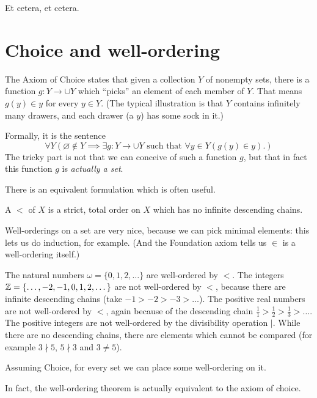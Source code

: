 Et cetera, et cetera.

\section{Choice and well-ordering}
The Axiom of Choice states that given a collection $Y$ of nonempty sets,
there is a function $g : Y \to \cup Y$ which ``picks'' an element of each member of $Y$.
That means $g(y) \in y$ for every $y \in Y$.
(The typical illustration is that $Y$ contains infinitely many drawers,
and each drawer (a $y$) has some sock in it.)

Formally, it is the sentence
\[ \forall Y \left(\varnothing \notin Y
	\implies 
	\exists g : Y \to \cup Y
	\text{ such that }
	\forall y \in Y \left( g(y) \in y \right).
	\right)
\]
The tricky part is not that we can conceive of such a function $g$,
but that in fact this function $g$ is \emph{actually a set}.

There is an equivalent formulation which is often useful.
\begin{definition}
	A  $<$ of $X$ is a strict, total order on $X$
	which has no infinite descending chains.
\end{definition}
Well-orderings on a set are very nice, because we can pick minimal elements:
this lets us do induction, for example.
(And the Foundation axiom tells us $\in$ is a well-ordering itself.)

\begin{example}
	\listhack
	\begin{enumerate}[(a)]
		\ii The natural numbers $\omega = \{0,1,2,\dots\}$
		are well-ordered by $<$.
		\ii The integers $\mathbb Z = \{\dots,-2,-1,0,1,2,\dots\}$ are not well-ordered by $<$,
		because there are infinite descending chains (take $-1 > -2 > -3 > \dots$).
		\ii The positive real numbers are not well-ordered by $<$,
		again because of the descending chain $\frac11>\frac12>\frac13>\dots$.
		\ii The positive integers are not well-ordered by the divisibility operation $\mid$.
		While there are no descending chains, there are elements which cannot be compared
		(for example $3 \nmid 5$, $5 \nmid 3$ and $3 \neq 5$).
	\end{enumerate}
\end{example}

\begin{theorem}
	Assuming Choice, for every set we can place some well-ordering on it.
\end{theorem}
In fact, the well-ordering theorem is actually equivalent to the axiom of choice.

